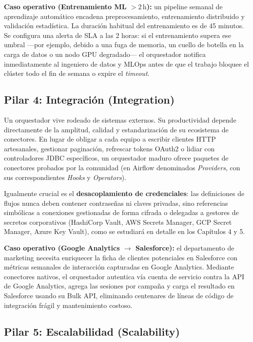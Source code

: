 \textbf{Caso operativo (Entrenamiento ML $> 2\,\text{h}$):} un pipeline semanal de aprendizaje automático encadena preprocesamiento, entrenamiento distribuido y validación estadística. La duración habitual del entrenamiento es de 45 minutos. Se configura una alerta de SLA a las 2 horas: si el entrenamiento supera ese umbral ---por ejemplo, debido a una fuga de memoria, un cuello de botella en la carga de datos o un nodo GPU degradado--- el orquestador notifica inmediatamente al ingeniero de datos y MLOps antes de que el trabajo bloquee el clúster todo el fin de semana o expire el \textit{timeout}.

\subsection{Pilar 4: Integración (Integration)}\label{subsec:pilar-integracion}

Un orquestador vive rodeado de sistemas externos. Su productividad depende directamente de la amplitud, calidad y estandarización de su ecosistema de conectores. En lugar de obligar a cada equipo a escribir clientes HTTP artesanales, gestionar paginación, refrescar tokens OAuth2 o lidiar con controladores JDBC específicos, un orquestador maduro ofrece paquetes de conectores probados por la comunidad (en Airflow denominados \textit{Providers}, con sus correspondientes \textit{Hooks} y \textit{Operators}).

Igualmente crucial es el \textbf{desacoplamiento de credenciales}: las definiciones de flujos nunca deben contener contraseñas ni claves privadas, sino referencias simbólicas a conexiones gestionadas de forma cifrada o delegadas a gestores de secretos corporativos (HashiCorp Vault, AWS Secrets Manager, GCP Secret Manager, Azure Key Vault), como se estudiará en detalle en los Capítulos 4 y 5.

\textbf{Caso operativo (Google Analytics $\to$ Salesforce):} el departamento de marketing necesita enriquecer la ficha de clientes potenciales en Salesforce con métricas semanales de interacción capturadas en Google Analytics. Mediante conectores nativos, el orquestador autentica vía cuenta de servicio contra la API de Google Analytics, agrega las sesiones por campaña y carga el resultado en Salesforce usando su Bulk API, eliminando centenares de líneas de código de integración frágil y mantenimiento costoso.

\subsection{Pilar 5: Escalabilidad (Scalability)}\label{subsec:pilar-escalabilidad}

